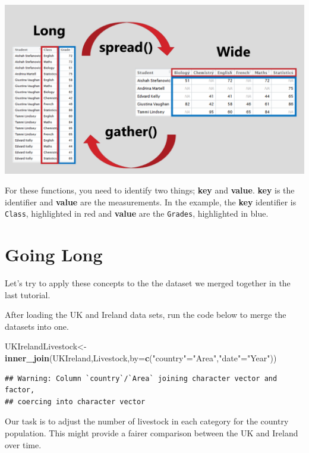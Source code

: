 \documentclass[]{book}
\newenvironment{Shaded}{\begin{snugshade}}{\end{snugshade}}
\newcommand{\DataTypeTok}[1]{\textcolor[rgb]{0.13,0.29,0.53}{#1}}
\newcommand{\KeywordTok}[1]{\textcolor[rgb]{0.13,0.29,0.53}{\textbf{#1}}}
\newcommand{\NormalTok}[1]{#1}
\newcommand{\StringTok}[1]{\textcolor[rgb]{0.31,0.60,0.02}{#1}}
\begin{document}
\includegraphics[width=17.78in]{Images/converting}

For these functions, you need to identify two things; \textbf{key} and \textbf{value}. \textbf{key} is the identifier and \textbf{value} are the measurements. In the example, the \textbf{key} identifier is \texttt{Class}, highlighted in red and \textbf{value} are the \texttt{Grades}, highlighted in blue.

\hypertarget{going-long}{%
\section{Going Long}\label{going-long}}

Let's try to apply these concepts to the the dataset we merged together in the last tutorial.

After loading the UK and Ireland data sets, run the code below to merge the datasets into one.

\begin{Shaded}
\begin{Highlighting}[]
\NormalTok{UKIrelandLivestock<-}\KeywordTok{inner_join}\NormalTok{(UKIreland,Livestock,}\DataTypeTok{by=}\KeywordTok{c}\NormalTok{(}\StringTok{"country"}\NormalTok{=}\StringTok{"Area"}\NormalTok{,}\StringTok{"date"}\NormalTok{=}\StringTok{"Year"}\NormalTok{))}
\end{Highlighting}
\end{Shaded}

\begin{verbatim}
## Warning: Column `country`/`Area` joining character vector and factor,
## coercing into character vector
\end{verbatim}

Our task is to adjust the number of livestock in each category for the country population. This might provide a fairer comparison between the UK and Ireland over time.
\end{document}
